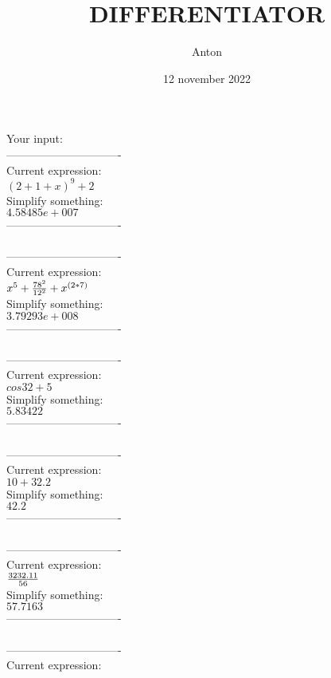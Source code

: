 \documentclass[12pt]{article}
\title{DIFFERENTIATOR}
\author{Anton}
\date{12 november 2022}
\begin{document}
    \maketitle
    Your input: \\
    
-------------------------------\\
Current expression:\\
\( {{(2+1+x)}^{9}}+2\) \\
Simplify something:\\
\( 4.58485e+007\) \\
-------------------------------\\
\\
-------------------------------\\
Current expression:\\
\( {{x}^{5}}+{{{{78}^{2}}}\over{{{12}^{2}}}}+{{x}^{(2*7)}}\) \\
Simplify something:\\
\( 3.79293e+008\) \\
-------------------------------\\
\\
-------------------------------\\
Current expression:\\
\( cos32+5\) \\
Simplify something:\\
\( 5.83422\) \\
-------------------------------\\
\\
-------------------------------\\
Current expression:\\
\( 10+32.2\) \\
Simplify something:\\
\( 42.2\) \\
-------------------------------\\
\\
-------------------------------\\
Current expression:\\
\( {{3232.11}\over{56}}\) \\
Simplify something:\\
\( 57.7163\) \\
-------------------------------\\
\\
-------------------------------\\
Current expression:\\
\end{document}
